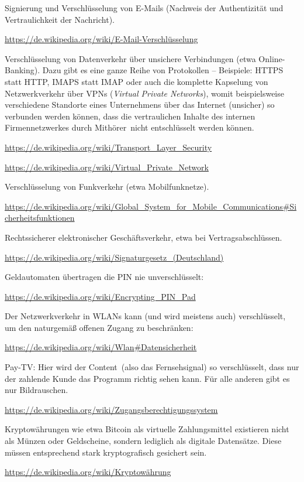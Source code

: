 \begin{compactitem}
\item Signierung und Verschlüsselung von E-Mails (Nachweis der Authentizität und
Vertraulichkeit der Nachricht).	

\url{https://de.wikipedia.org/wiki/E-Mail-Verschlüsselung}

\item Verschlüsselung von Datenverkehr über unsichere Verbindungen (etwa
Online-Banking). Dazu gibt es eine ganze Reihe von Protokollen -- Beispiele:
HTTPS statt HTTP, IMAPS statt IMAP oder auch die komplette Kapselung von
Netzwerkverkehr über VPNs (\emph{Virtual Private Networks}), womit beispielsweise
verschiedene Standorte eines Unternehmens über das Internet (unsicher) so
verbunden werden können, dass die vertraulichen Inhalte des internen
Firmennetzwerkes durch \glqq Mithörer\grqq\ nicht entschlüsselt werden können.

\url{https://de.wikipedia.org/wiki/Transport\_Layer\_Security} 

\url{https://de.wikipedia.org/wiki/Virtual\_Private\_Network} 

\item Verschlüsselung von Funkverkehr (etwa Mobilfunknetze).	 

\url{https://de.wikipedia.org/wiki/Global\_System\_for\_Mobile\_Communications\#Sicherheitsfunktionen} 

\item Rechtssicherer elektronischer Geschäftsverkehr, etwa bei
Vertragsabschlüssen.

\url{https://de.wikipedia.org/wiki/Signaturgesetz\_(Deutschland)} 

\item Geldautomaten übertragen die PIN nie unverschlüsselt:	

\url{https://de.wikipedia.org/wiki/Encrypting\_PIN\_Pad} 

\item Der Netzwerkverkehr in WLANs kann (und wird meistens auch) verschlüsselt,
um den naturgemäß offenen Zugang zu beschränken:

\url{https://de.wikipedia.org/wiki/Wlan\#Datensicherheit} 

\item Pay-TV: Hier wird der \glqq Content\grqq\ (also das Fernsehsignal) so
verschlüsselt, dass nur der zahlende Kunde das Programm richtig sehen kann. Für
alle anderen gibt es nur Bildrauschen.

\url{https://de.wikipedia.org/wiki/Zugangsberechtigungssystem} 

\item Kryptowährungen wie etwa Bitcoin als virtuelle Zahlungsmittel existieren
nicht als Münzen oder Geldscheine, sondern lediglich als digitale Datensätze. Diese müssen
entsprechend stark kryptografisch gesichert sein.

\url{https://de.wikipedia.org/wiki/Kryptowährung} 
\end{compactitem}


